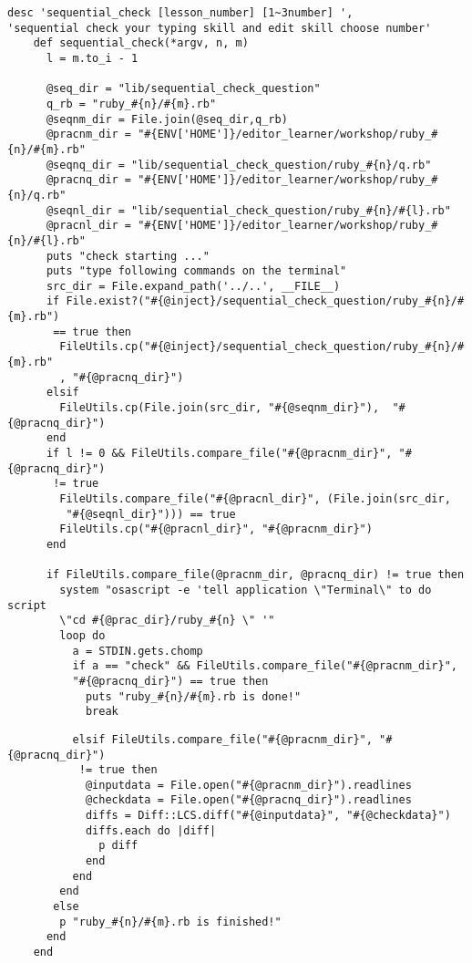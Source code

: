 \begin{screen}
{\small
\begin{verbatim}
desc 'sequential_check [lesson_number] [1~3number] ',
'sequential check your typing skill and edit skill choose number'
    def sequential_check(*argv, n, m)
      l = m.to_i - 1
     
      @seq_dir = "lib/sequential_check_question"
      q_rb = "ruby_#{n}/#{m}.rb"
      @seqnm_dir = File.join(@seq_dir,q_rb)
      @pracnm_dir = "#{ENV['HOME']}/editor_learner/workshop/ruby_#{n}/#{m}.rb"
      @seqnq_dir = "lib/sequential_check_question/ruby_#{n}/q.rb"
      @pracnq_dir = "#{ENV['HOME']}/editor_learner/workshop/ruby_#{n}/q.rb"      
      @seqnl_dir = "lib/sequential_check_question/ruby_#{n}/#{l}.rb"
      @pracnl_dir = "#{ENV['HOME']}/editor_learner/workshop/ruby_#{n}/#{l}.rb"      
      puts "check starting ..."
      puts "type following commands on the terminal"
      src_dir = File.expand_path('../..', __FILE__)
      if File.exist?("#{@inject}/sequential_check_question/ruby_#{n}/#{m}.rb")
       == true then
        FileUtils.cp("#{@inject}/sequential_check_question/ruby_#{n}/#{m}.rb"
        , "#{@pracnq_dir}")
      elsif
        FileUtils.cp(File.join(src_dir, "#{@seqnm_dir}"),  "#{@pracnq_dir}")
      end
      if l != 0 && FileUtils.compare_file("#{@pracnm_dir}", "#{@pracnq_dir}")
       != true
        FileUtils.compare_file("#{@pracnl_dir}", (File.join(src_dir,
         "#{@seqnl_dir}"))) == true
        FileUtils.cp("#{@pracnl_dir}", "#{@pracnm_dir}")
      end
      
      if FileUtils.compare_file(@pracnm_dir, @pracnq_dir) != true then
        system "osascript -e 'tell application \"Terminal\" to do script 
        \"cd #{@prac_dir}/ruby_#{n} \" '"
        loop do
          a = STDIN.gets.chomp
          if a == "check" && FileUtils.compare_file("#{@pracnm_dir}", 
          "#{@pracnq_dir}") == true then
            puts "ruby_#{n}/#{m}.rb is done!"
            break
\end{verbatim}}
\end{screen}
\begin{screen}
{\small
\begin{verbatim}            
          elsif FileUtils.compare_file("#{@pracnm_dir}", "#{@pracnq_dir}")
           != true then
            @inputdata = File.open("#{@pracnm_dir}").readlines
            @checkdata = File.open("#{@pracnq_dir}").readlines
            diffs = Diff::LCS.diff("#{@inputdata}", "#{@checkdata}")
            diffs.each do |diff|
              p diff
            end
          end
        end
       else
        p "ruby_#{n}/#{m}.rb is finished!"
      end
    end
\end{verbatim}}
\end{screen}

